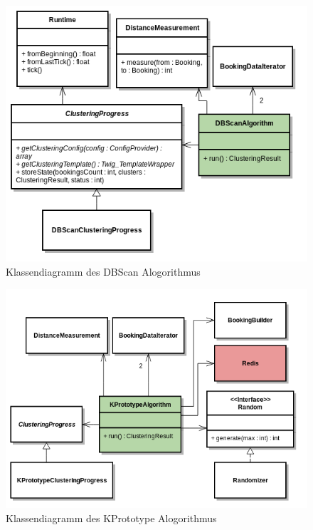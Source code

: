 \begin{figure}[H]
	\centering
	\includegraphics[width=1\textwidth]{images/diagram-class-DBScanAlgorithm}
	\caption{Klassendiagramm des DBScan Alogorithmus}
	\label{fig:proofofconcept:klassenstruktur:3}
\end{figure}
\begin{figure}[H]
	\centering
	\includegraphics[width=1\textwidth]{images/diagram-class-KPrototypeAlgorithm}
	\caption{Klassendiagramm des KPrototype Alogorithmus}
	\label{fig:proofofconcept:klassenstruktur:4}
\end{figure}

